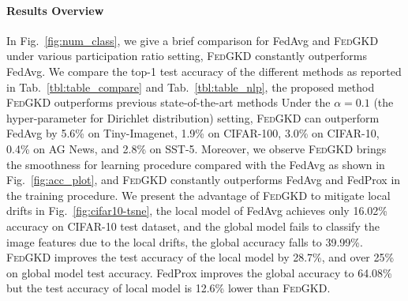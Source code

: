 \documentclass{article} %
\newcommand{\system}{\textsc{FedGKD}\xspace}
\begin{document}
\paragraph{Results Overview}
In Fig.~\ref{fig:num_class}, we give a brief comparison for FedAvg and \system under various participation ratio setting, \system constantly outperforms FedAvg. 
We compare the  top-1 test accuracy of the different methods as reported in Tab.~\ref{tbl:table_compare} and Tab.~\ref{tbl:table_nlp}, the proposed method \system outperforms previous state-of-the-art methods 
Under the $\alpha=0.1$ (the hyper-parameter for Dirichlet distribution) setting, \system can outperform FedAvg by 5.6\% on Tiny-Imagenet, 1.9\% on CIFAR-100, 3.0\% on CIFAR-10, 0.4\% on AG News, and 2.8\% on SST-5. 
Moreover, we observe \system brings the smoothness for learning procedure compared with the FedAvg as shown in Fig.~\ref{fig:acc_plot}, and \system constantly outperforms FedAvg and FedProx in the training procedure. 
We present the advantage of \system to mitigate local drifts in Fig.~\ref{fig:cifar10-tsne}, the local model of FedAvg achieves only 16.02\% accuracy on CIFAR-10 test dataset, and the global model fails to classify the image features due to the local drifts, the global accuracy falls to 39.99\%. \system improves the test accuracy of the local model by 28.7\%, and over 25\% on global model test accuracy. FedProx improves the global accuracy to 64.08\% but the test accuracy of local model is 12.6\% lower than \system.
\end{document}

